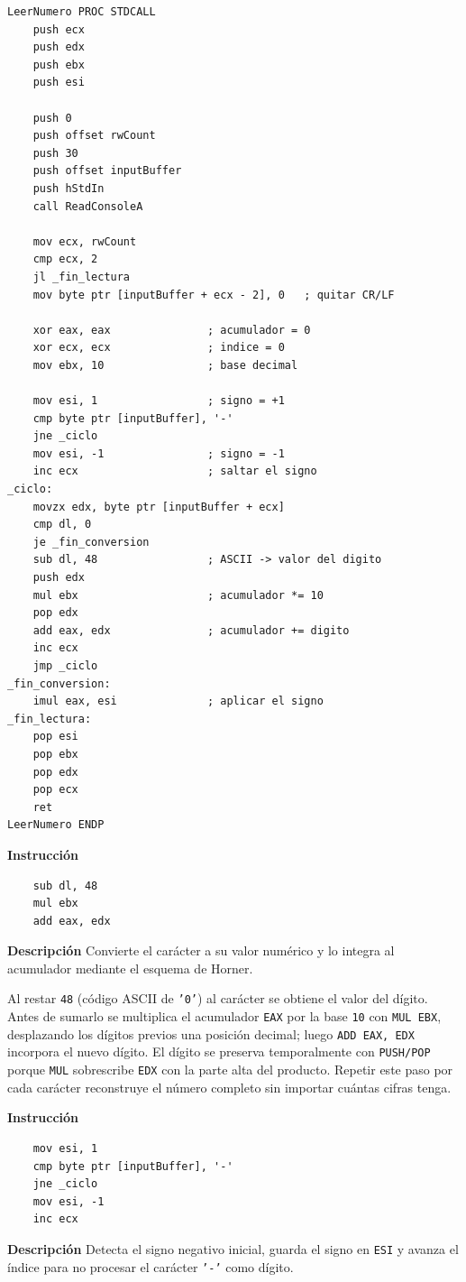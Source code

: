 \documentclass[a4paper,12pt]{article}
\begin{document}
\begin{lstlisting}[style=assemblyStyle, caption={Procedimiento \texttt{LeerNumero}: conversión de cadena a entero con signo.}, label={lst:leernumero}]
LeerNumero PROC STDCALL
    push ecx
    push edx
    push ebx
    push esi

    push 0
    push offset rwCount
    push 30
    push offset inputBuffer
    push hStdIn
    call ReadConsoleA

    mov ecx, rwCount
    cmp ecx, 2
    jl _fin_lectura
    mov byte ptr [inputBuffer + ecx - 2], 0   ; quitar CR/LF

    xor eax, eax               ; acumulador = 0
    xor ecx, ecx               ; indice = 0
    mov ebx, 10                ; base decimal

    mov esi, 1                 ; signo = +1
    cmp byte ptr [inputBuffer], '-'
    jne _ciclo
    mov esi, -1                ; signo = -1
    inc ecx                    ; saltar el signo
_ciclo:
    movzx edx, byte ptr [inputBuffer + ecx]
    cmp dl, 0
    je _fin_conversion
    sub dl, 48                 ; ASCII -> valor del digito
    push edx
    mul ebx                    ; acumulador *= 10
    pop edx
    add eax, edx               ; acumulador += digito
    inc ecx
    jmp _ciclo
_fin_conversion:
    imul eax, esi              ; aplicar el signo
_fin_lectura:
    pop esi
    pop ebx
    pop edx
    pop ecx
    ret
LeerNumero ENDP
\end{lstlisting}

\begin{instruccionbox}
\textbf{Instrucción}
\begin{lstlisting}
    sub dl, 48
    mul ebx
    add eax, edx
\end{lstlisting}
\textbf{Descripción}
Convierte el carácter a su valor numérico y lo integra al acumulador mediante el esquema de Horner.
\end{instruccionbox}

Al restar \texttt{48} (código ASCII de \texttt{'0'}) al carácter se obtiene el valor del dígito. Antes de sumarlo se multiplica el acumulador \texttt{EAX} por la base \texttt{10} con \texttt{MUL EBX}, desplazando los dígitos previos una posición decimal; luego \texttt{ADD EAX, EDX} incorpora el nuevo dígito. El dígito se preserva temporalmente con \texttt{PUSH/POP} porque \texttt{MUL} sobrescribe \texttt{EDX} con la parte alta del producto. Repetir este paso por cada carácter reconstruye el número completo sin importar cuántas cifras tenga.

\begin{instruccionbox}
\textbf{Instrucción}
\begin{lstlisting}
    mov esi, 1
    cmp byte ptr [inputBuffer], '-'
    jne _ciclo
    mov esi, -1
    inc ecx
\end{lstlisting}
\textbf{Descripción}
Detecta el signo negativo inicial, guarda el signo en \texttt{ESI} y avanza el índice para no procesar el carácter \texttt{'-'} como dígito.
\end{instruccionbox}
\end{document}
